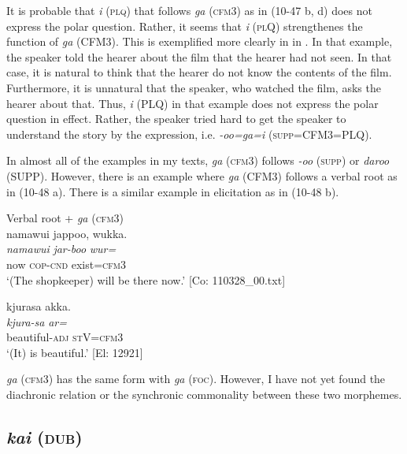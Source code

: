 It is probable that \textit{i} (\textsc{plq}) that follows \textit{ga} (\textsc{cfm}3) as in (10-47 b, d) does not express the polar question. Rather, it seems that \textit{i} (\textsc{pl}Q) strengthenes the function of \textit{ga} (CFM3). This is exemplified more clearly in  in . In that example, the speaker told the hearer about the film that the hearer had not seen. In that case, it is natural to think that the hearer do not know the contents of the film. Furthermore, it is unnatural that the speaker, who watched the film, asks the hearer about that. Thus, \textit{i} (PLQ) in that example does not express the polar question in effect. Rather, the speaker tried hard to get the speaker to understand the story by the expression, i.e. \textit{{}-oo=ga=i} (\textsc{supp}=CFM3=PLQ).

In almost all of the examples in my texts, \textit{ga} (\textsc{cfm}3) follows \textit{-oo} (\textsc{supp}) or \textit{daroo} (SUPP). However, there is an example where \textit{ga} (CFM3) follows a verbal root as in (10-48 a). There is a similar example in elicitation as in (10-48 b).

\ea\label{ex:10.48}   Verbal root + \textit{ga} (\textsc{cfm}3)\\
  \ea  %
      \glll    namawui  jappoo,  wukka.\\
      \textit{namawui}  \textit{jar-boo}  \textit{wur=}\\
      now  \textsc{cop}-\textsc{cnd}  exist=\textsc{cfm}3\\
      \glt       ‘(The shopkeeper) will be there now.’ [Co: 110328\_00.txt]

  \ex  %
      \glll    kjurasa  akka.\\
      \textit{kjura-sa}  \textit{ar=}\\
      beautiful-\textsc{adj}  \textsc{st}V=\textsc{cfm}3\\
      \glt       ‘(It) is beautiful.’ [El: 12921]
    \z
\z

  \textit{ga} (\textsc{cfm}3) has the same form with \textit{ga} (\textsc{foc}). However, I have not yet found the diachronic relation or the synchronic commonality between these two morphemes.

\subsection{\textit{kai} (\textsc{dub})}\label{sec:10.3.6}

